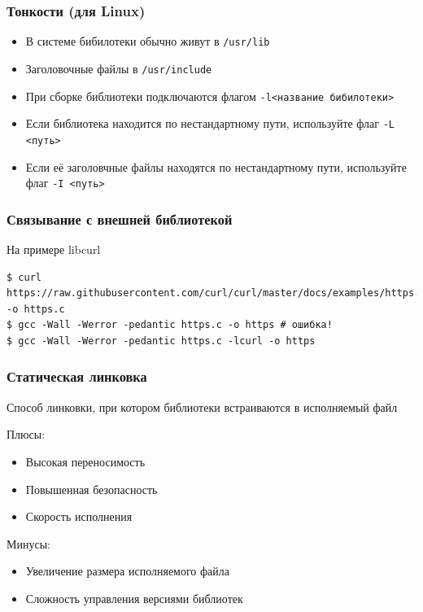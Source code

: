 \documentclass[aspectratio=169]{beamer}
\begin{document}
\begin{frame}
    \frametitle{Тонкости (для Linux)}

    \begin{itemize}
        \item В системе бибилотеки обычно живут в \texttt{/usr/lib}
        \item Заголовочные файлы в \texttt{/usr/include}
        \item При сборке библиотеки подключаются флагом \texttt{-l<название бибилотеки>}
        \item Если библиотека находится по нестандартному пути, используйте флаг \texttt{-L <путь>}
        \item Если её заголовчные файлы находятся по нестандартному пути, используйте флаг \texttt{-I <путь>}
    \end{itemize}

\end{frame}

\begin{frame}[fragile]
    \frametitle{Связывание с внешней библиотекой}

    На примере libcurl
    \begin{verbatim}
$ curl https://raw.githubusercontent.com/curl/curl/master/docs/examples/https.c -o https.c
$ gcc -Wall -Werror -pedantic https.c -o https # ошибка!
$ gcc -Wall -Werror -pedantic https.c -lcurl -o https
    \end{verbatim}
\end{frame}

\begin{frame}
    \frametitle{Статическая линковка}

    Способ линковки, при котором библиотеки встраиваются в исполняемый файл

    Плюсы:
    \begin{itemize}
        \item Высокая переносимость
        \item Повышенная безопасность
        \item Скорость исполнения
    \end{itemize}
    Минусы:
    \begin{itemize}
        \item Увеличение размера исполняемого файла
        \item Сложность управления версиями библиотек
    \end{itemize}
\end{frame}
\end{document}
